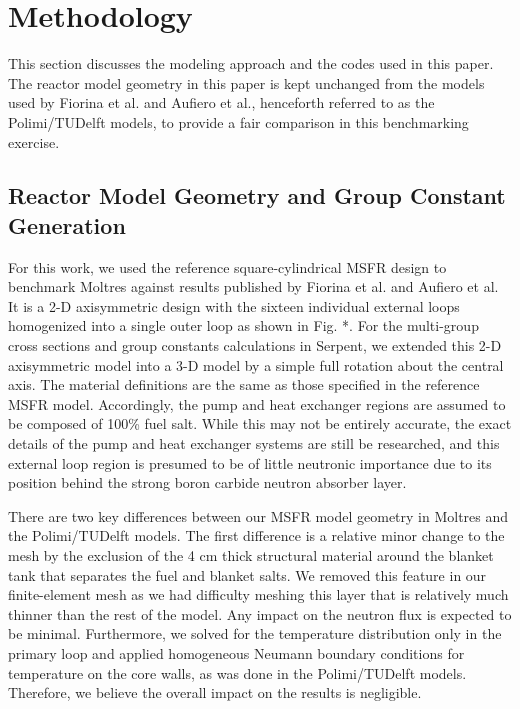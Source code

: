 \section{Methodology}

This section discusses the modeling approach and the codes used in this paper.
The reactor model geometry in this paper is kept unchanged from the models
used by Fiorina et al. and Aufiero et al., henceforth referred to as the
Polimi/TUDelft models, to provide a fair comparison in this
benchmarking exercise.

\subsection{Reactor Model Geometry and Group Constant Generation}

For this work, we used the reference square-cylindrical \gls{MSFR} design to
benchmark Moltres against results published by Fiorina et al. and Aufiero et
al. It is a 2-D axisymmetric design with the sixteen individual external loops
homogenized into a single outer loop as shown in Fig. *. For the multi-group
cross sections and group constants calculations in Serpent, we extended this
2-D axisymmetric model into a 3-D model by a simple full rotation about the
central axis. The material definitions are the same as those specified in the
reference \gls{MSFR} model. Accordingly, the pump and heat exchanger regions
are assumed to be composed of 100\% fuel salt. While this may not be entirely
accurate, the exact details of the pump and heat exchanger systems are still
be researched, and this external loop region is presumed to be of little
neutronic importance due to its position behind the strong boron carbide
neutron absorber layer.

There are two key differences between our \gls{MSFR} model geometry in
Moltres and the Polimi/TUDelft models. The first difference is a relative
minor change to the mesh by the exclusion of the 4 cm thick structural
material around the blanket tank that separates the fuel and blanket salts.
We removed this feature in our finite-element mesh as we had difficulty
meshing this layer that is relatively much thinner than the rest of the model.
Any impact on the
neutron flux is expected to be minimal. Furthermore, we solved for the
temperature distribution only in the primary loop and applied homogeneous
Neumann boundary conditions for temperature on the core walls, as was done in
the Polimi/TUDelft models. Therefore, we believe the overall impact on the
results is negligible.


